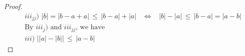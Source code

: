 \begin{recall}
\begin{proof}
\begin{align*}
        &iii_{jj}) \hspace{4pt} \lvert b \rvert = \lvert b - a + a \rvert \hspace{2pt} \leq \hspace{2pt} \lvert b - a \rvert + \lvert a \rvert \hspace{10pt} \Longleftrightarrow \hspace{10pt} \lvert b \rvert - \lvert a \rvert \hspace{2pt} \leq \hspace{2pt} \lvert b - a \rvert = \lvert a - b \rvert \\[1ex]
        &\text{By $iii_{j})$ and $iii_{jj}$, we have} \\[1ex]
        &iii) \hspace{4pt} \Big\lvert \lvert a \rvert - \lvert b \rvert \Big\rvert \hspace{2pt} \leq \hspace{2pt} \lvert a - b \rvert
    \end{align*}
\end{proof}
\end{recall}

